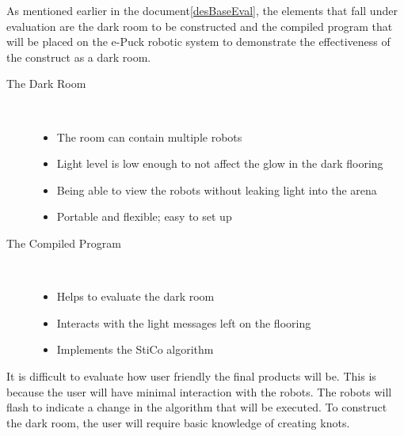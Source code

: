 As mentioned earlier in the document\ref{desBaseEval}, the elements that fall
under evaluation are the dark room to be constructed and the compiled program
that will be placed on the e-Puck robotic system to demonstrate the 
effectiveness of the construct as a dark room.

\begin{description}
  \item[The Dark Room] \hfill \\
  \begin{itemize}
    \item The room can contain multiple robots
    \item Light level is low enough to not affect the glow in the dark flooring
    \item Being able to view the robots without leaking light into the arena
    \item Portable and flexible; easy to set up
  \end{itemize}
  \item[The Compiled Program] \hfill \\
  \begin{itemize}
    \item Helps to evaluate the dark room
    \item Interacts with the light messages left on the flooring
    \item Implements the StiCo algorithm
  \end{itemize}
\end{description}

It is difficult to evaluate how user friendly the final products will be.  This
is because the user will have minimal interaction with the robots.  The robots
will flash to indicate a change in the algorithm that will be executed.  To
construct the dark room, the user will require basic knowledge of creating
knots.


